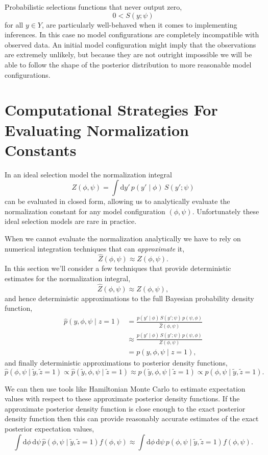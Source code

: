 \documentclass[
  letterpaper,
  DIV=11,
  numbers=noendperiod]{scrartcl}
\begin{document}
Probabilistic selections functions that never output zero, \[
0 < S(y; \psi)
\] for all \(y \in Y\), are particularly well-behaved when it comes to
implementing inferences. In this case no model configurations are
completely incompatible with observed data. An initial model
configuration might imply that the observations are extremely unlikely,
but because they are not outright impossible we will be able to follow
the shape of the posterior distribution to more reasonable model
configurations.

\section{Computational Strategies For Evaluating Normalization
Constants}\label{sec:estimation}

In an ideal selection model the normalization integral \[
Z(\phi, \psi) = \int \mathrm{d}y' \, p(y' \mid \phi) \, S(y'; \psi )
\] can be evaluated in closed form, allowing us to analytically evaluate
the normalization constant for any model configuration \((\phi, \psi)\).
Unfortunately these ideal selection models are rare in practice.

When we cannot evaluate the normalization analytically we have to rely
on numerical integration techniques that can \emph{approximate} it, \[
\hat{Z}(\phi, \psi) \approx Z(\phi, \psi).
\] In this section we'll consider a few techniques that provide
deterministic estimates for the normalization integral, \[
\hat{Z}(\phi, \psi) \approx Z(\phi, \psi),
\] and hence deterministic approximations to the full Bayesian
probability density function, \begin{align*}
\hat{p}(y, \phi, \psi \mid z = 1)
&=
\frac{ p(y' \mid \phi) \, S(y'; \psi ) \, p(\psi, \phi) }{ \hat{Z}(\phi, \psi) }
\\
&\approx
\frac{ p(y' \mid \phi) \, S(y'; \psi ) \, p(\psi, \phi) }{ Z(\phi, \psi) }
\\
&=
p(y, \phi, \psi \mid z = 1),
\end{align*} and finally deterministic approximations to posterior
density functions, \[
\hat{p}( \phi, \psi \mid \tilde{y}, \tilde{z} = 1)
\propto
\hat{p}(\tilde{y}, \phi, \psi \mid \tilde{z} = 1)
\approx
p(\tilde{y}, \phi, \psi \mid \tilde{z} = 1)
\propto
p( \phi, \psi \mid \tilde{y}, \tilde{z} = 1).
\]

We can then use tools like Hamiltonian Monte Carlo to estimate
expectation values with respect to these approximate posterior density
functions. If the approximate posterior density function is close enough
to the exact posterior density function then this can provide reasonably
accurate estimates of the exact posterior expectation values, \[
\int \mathrm{d} \phi \, \mathrm{d} \psi \,
\hat{p}(\phi, \psi \mid \tilde{y}, \tilde{z} = 1) f(\phi, \psi)
\approx
\int \mathrm{d} \phi \, \mathrm{d} \psi \,
p(\phi, \psi \mid \tilde{y}, \tilde{z} = 1) f(\phi, \psi).
\]
\end{document}
